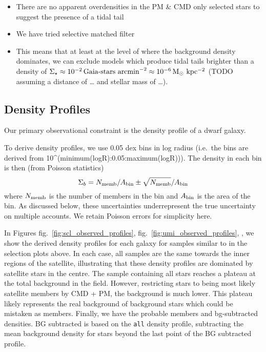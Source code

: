 \begin{itemize}
\item
  There are no apparent overdensities in the PM \& CMD only selected
  stars to suggest the presence of a tidal tail
\item
  We have tried selective matched filter
\item
  This means that at least at the level of where the background density
  dominates, we can exclude models which produce tidal tails brighter
  than a density of
  \(\Sigma_\star \approx 10^{-2}\,\text{Gaia-stars\ arcmin}^{-2} \approx 10^{-6} \, {\rm M_\odot\ kpc^{-2}}\)
  (TODO assuming a distance of \ldots{} and stellar mass of \ldots).
\end{itemize}

\subsection{Density Profiles}\label{density-profiles}

Our primary observational constraint is the density profile of a dwarf
galaxy.

To derive density profiles, we use 0.05 dex bins in log radius (i.e.~the
bins are derived from 10\^{}(minimum(logR):0.05:maximum(logR))). The
density in each bin is then (from Poisson statistics) \[
\Sigma_b = N_{\rm memb} / A_{\rm bin} \pm \sqrt{N_{\rm memb}} / A_{\rm bin}
\] where \(N_{\rm memb}\) is the number of members in the bin and
\(A_{\rm bin}\) is the area of the bin. As discussed below, these
uncertainties underrepresent the true uncertainty on multiple accounts.
We retain Poisson errors for simplicity here.

In Figures fig.~\ref{fig:scl_observed_profiles},
fig.~\ref{fig:umi_observed_profiles},
\citet{fig_fornax_observed_profiles}, we show the derived density
profiles for each galaxy for samples similar to in the selection plots
above. In each case, all samples are the same towards the inner regions
of the satellite, illustrating that these density profiles are dominated
by satellite stars in the centre. The sample containing all stars
reaches a plateau at the total background in the field. However,
restricting stars to being most likely satellite members by CMD + PM,
the background is much lower. This plateau likely represents the real
background of background stars which could be mistaken as members.
Finally, we have the probable members and bg-subtracted densities. BG
subtracted is based on the \texttt{all} density profile, subtracting the
mean background density for stars beyond the last point of the BG
subtracted profile.

